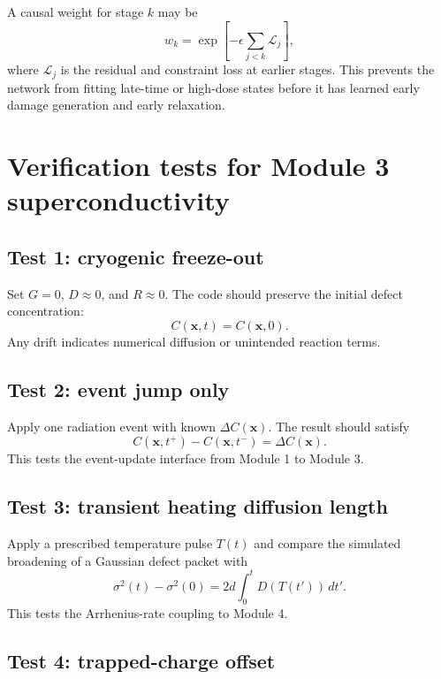 \documentclass[11pt]{article}
\newcommand{\x}{\mathbf{x}}
\begin{document}
A causal weight for stage $k$ may be
\begin{equation}
w_k=\exp\left[-\epsilon\sum_{j<k}\mathcal{L}_j\right],
\label{eq:causal_weight_m3}
\end{equation}
where $\mathcal{L}_j$ is the residual and constraint loss at earlier stages. This prevents the network from fitting late-time or high-dose states before it has learned early damage generation and early relaxation.

\section{Verification tests for Module 3 superconductivity}

\subsection{Test 1: cryogenic freeze-out}

Set $G=0$, $D\approx0$, and $R\approx0$. The code should preserve the initial defect concentration:
\begin{equation}
C(\x,t)=C(\x,0).
\end{equation}
Any drift indicates numerical diffusion or unintended reaction terms.

\subsection{Test 2: event jump only}

Apply one radiation event with known $\Delta C(\x)$. The result should satisfy
\begin{equation}
C(\x,t^+)-C(\x,t^-)=\Delta C(\x).
\end{equation}
This tests the event-update interface from Module 1 to Module 3.

\subsection{Test 3: transient heating diffusion length}

Apply a prescribed temperature pulse $T(t)$ and compare the simulated broadening of a Gaussian defect packet with
\begin{equation}
\sigma^2(t)-\sigma^2(0)=2d\int_0^t D(T(t'))\,dt'.
\end{equation}
This tests the Arrhenius-rate coupling to Module 4.

\subsection{Test 4: trapped-charge offset}
\end{document}
